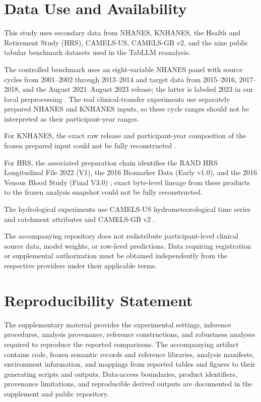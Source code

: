 \documentclass{article} %
\begin{document}
\section*{Data Use and Availability}

This study uses secondary data from NHANES, KNHANES, the Health and
Retirement Study (HRS), CAMELS-US, CAMELS-GB v2, and the nine public
tabular benchmark datasets used in the TabLLM reanalysis.

The controlled benchmark uses an eight-variable NHANES panel with source
cycles from 2001--2002 through 2013--2014 and target data from
2015--2016, 2017--2018, and the August 2021--August 2023 release; the
latter is labeled 2023 in our local preprocessing
\citep{cdcnhanesdata}. The real clinical-transfer experiments use
separately prepared NHANES and KNHANES inputs, so these cycle ranges
should not be interpreted as their participant-year ranges.

For KNHANES, the exact raw release and participant-year composition of
the frozen prepared input could not be fully reconstructed
\citep{kweon2014knhanes}.

For HRS, the associated preparation chain identifies the RAND HRS
Longitudinal File 2022 (V1), the 2016 Biomarker Data (Early v1.0), and
the 2016 Venous Blood Study (Final V3.0)
\citep{hrs2025randpublic,rand2025hrslong,hrs2020biomarker2016,hrs2025vbs2016};
exact byte-level lineage from these products to the frozen analysis
snapshot could not be fully reconstructed.

The hydrological experiments use CAMELS-US hydrometeorological time
series and catchment attributes
\citep{newman2014camelsdata,addor2017camelsattributes} and CAMELS-GB v2
\citep{coxon2025camelsgbv2}.

The accompanying repository does not redistribute participant-level
clinical source data, model weights, or row-level predictions.
Data requiring registration or supplemental authorization must be
obtained independently from the respective providers under their
applicable terms.

\section*{Reproducibility Statement}

The supplementary material provides the experimental settings, inference
procedures, analysis provenance, reference constructions, and robustness
analyses required to reproduce the reported comparisons.
The accompanying artifact contains code, frozen semantic records and
reference libraries, analysis manifests, environment information, and
mappings from reported tables and figures to their generating scripts
and outputs.
Data-access boundaries, product identifiers, provenance limitations, and
reproducible derived outputs are documented in the supplement and public
repository.
\end{document}
